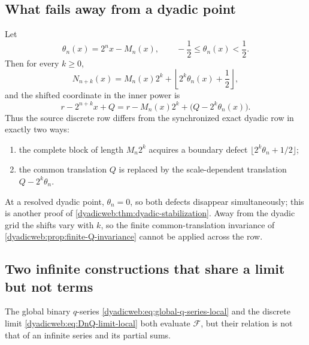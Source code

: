 \documentclass[11pt,oneside]{article}
\theoremstyle{definition}
\theoremstyle{remark}
\begin{document}
\subsection{What fails away from a dyadic point}

Let
\begin{equation}
 \theta_n(x)=2^nx-M_n(x),
 \qquad -\frac12\le\theta_n(x)<\frac12.                  \label{dyadicweb:eq:theta-n}
\end{equation}
Then for every $k\ge0$,
\begin{equation}
 N_{n+k}(x)
 =M_n(x)2^k+\left\lfloor2^k\theta_n(x)+\frac12\right\rfloor, \label{dyadicweb:eq:cutoff-defect}
\end{equation}
and the shifted coordinate in the inner power is
\begin{equation}
 r-2^{n+k}x+Q
 =r-M_n(x)2^k+\bigl(Q-2^k\theta_n(x)\bigr).               \label{dyadicweb:eq:shift-defect}
\end{equation}
Thus the source discrete row differs from the synchronized exact dyadic row in exactly two
ways:
\begin{enumerate}
\item the complete block of length $M_n2^k$ acquires a boundary defect
      $\lfloor2^k\theta_n+1/2\rfloor$;
\item the common translation $Q$ is replaced by the scale-dependent translation
      $Q-2^k\theta_n$.
\end{enumerate}
At a resolved dyadic point, $\theta_n=0$, so both defects disappear simultaneously; this is
another proof of \cref{dyadicweb:thm:dyadic-stabilization}.  Away from the dyadic grid the shifts vary
with $k$, so the finite common-translation invariance of
\cref{dyadicweb:prop:finite-Q-invariance} cannot be applied across the row.

\subsection{Two infinite constructions that share a limit but not terms}

The global binary $q$-series \eqref{dyadicweb:eq:global-q-series-local} and the discrete limit
\eqref{dyadicweb:eq:DnQ-limit-local} both evaluate $\mathcal F$, but their relation is not that of an
infinite series and its partial sums.
\end{document}
